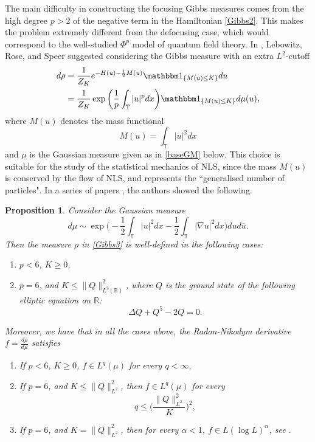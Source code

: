 \documentclass[letterpaper, 11pt,  reqno]{amsart}
\newtheorem{proposition}[theorem]{Proposition}
\theoremstyle{definition}
\newcommand{\1}{\mathbbm 1}
\newcommand{\R}{\mathbb{R}}
\newcommand{\T}{\mathbb{T}}
\newcommand{\0}{\mathbf 0}
\newcommand{\al}{\alpha}
\newcommand{\cj}{\overline}
\numberwithin{equation}{section}
\numberwithin{theorem}{section}
\begin{document}
The main difficulty in constructing the focusing Gibbs measures
comes from the high degree $p>2$ of the negative term in the Hamiltonian \eqref{Gibbs2}.
This makes the problem extremely different from the defocusing case, which would correspond to the well-studied $\Phi^p$ model of quantum field theory. In \cite{Lebowitz1988}, Lebowitz, Rose, and Speer suggested considering the Gibbs measure with an extra $L^2$-cutoff 
\begin{align}
\begin{split}
d\rho 
& = \frac{1}{Z_K} e^{- H(u) - \frac12 M(u)} \1_{\{M(u) \le K\}} d u \\
& = \frac{1}{Z_K} \exp\bigg(\frac{1}{p} \int_\T |u|^p dx\bigg) 
\1_{\{M(u) \le K\}} d\mu(u), 
\label{Gibbs3}
\end{split}
\end{align}
where $M(u)$ denotes the mass functional 
\begin{equation}
M(u) = \int_\T |u|^2 dx 
\label{mass}
\end{equation}
and $\mu$ is the Gaussian measure given as in
\eqref{baseGM} below.
This choice is suitable for the study of the statistical mechanics of NLS, since the mass $M(u)$ is conserved by the flow of NLS, and represents the ``generalised number of particles". 
In a series of papers \cite{Lebowitz1988, Bo94, OST, TolWeb}, the authors showed the following.
\begin{proposition}
    Consider the Gaussian measure 
    \begin{equation}\label{baseGM}
        d\mu \sim \exp\Big( - \frac 12 \int_\T |u|^2 dx - \frac 12 \int_\T |\nabla u|^2 dx  \Big)dud\cj u.
    \end{equation}
    Then the measure $\rho$ in \eqref{Gibbs3} is well-defined in the following cases: 
    \begin{enumerate}
        \item $ p < 6$, $K \ge 0$, 
        \item $ p = 6$, and $K \le \|Q \|_{L^2(\R)}^2$, where $Q$ is the ground state of the following elliptic equation on $\R$:
        $$ \Delta Q +  Q^5 - 2 Q = 0. $$
    \end{enumerate}
    Moreover, we have that in all the cases above, the Radon-Nikodym derivative $f = \frac{d \rho}{d \mu}$ satisfies 
    \begin{enumerate}
        \item If $ p < 6$, $K \ge 0$, $f \in L^q(\mu)$ for every $q <\infty $,
        \item If $ p = 6$, and $K \le \|Q \|_{L^2}^2$, then $f \in L^q(\mu)$ for every 
        $$q \le \Big(\frac{\|Q\|_{L^2}^2}{K}\Big)^2, $$
        \item If $p =6$, and $K = \|Q \|_{L^2}^2$, then for every $\al < 1$, $f \in L (\log L)^\al $, 
        see \cite[Proposition 6]{HoNi}. 
    \end{enumerate}
\end{proposition}
 
\end{document}
